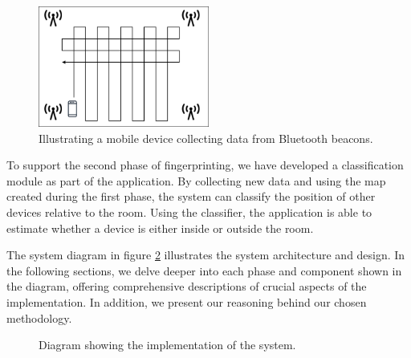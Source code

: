 \begin{figure}[H]
    \centering
    \includegraphics[width=0.5\textwidth]{images/CreateMap.drawio.png}
    \caption{Illustrating a mobile device collecting data from Bluetooth beacons.}
    \label{fig:CreateMap}
\end{figure}

To support the second phase of fingerprinting, we have developed a classification module as part of the application. 
By collecting new data and using the map created during the first phase, the system can classify the position of other devices relative to the room. 
Using the classifier, the application is able to estimate whether a device is either inside or outside the room.

The system diagram in figure \ref{fig:implementation_diagram} illustrates the system architecture and design.
In the following sections, we delve deeper into each phase and component shown in the diagram, offering comprehensive descriptions of crucial aspects of the implementation.
In addition, we present our reasoning behind our chosen methodology.

\begin{figure}[H]
  \centering
  \caption{Diagram showing the implementation of the system.}
  \label{fig:implementation_diagram}
\end{figure}